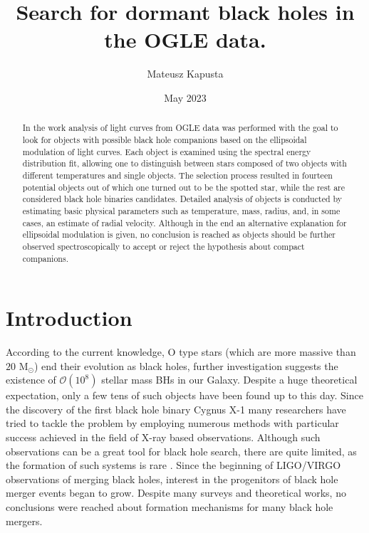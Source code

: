 \documentclass{pracalicmgr}
\author{Mateusz Kapusta}
\title{Search for dormant black holes in the OGLE data.}
\date{May 2023}
\begin{document}
    \maketitle
    \let\cleardoublepage\clearpage
\begin{abstract}
    In the work analysis of light curves from OGLE data was performed with the goal to look for objects with possible black hole companions 
    based on the ellipsoidal modulation of light curves. Each object is examined using the spectral energy distribution fit, allowing one to distinguish
    between stars composed of two objects with different temperatures and single objects. The selection process resulted in fourteen
    potential objects out of which one turned out to be the spotted star, while the rest are considered black hole binaries candidates.
    Detailed analysis of objects is conducted by estimating basic physical parameters such as temperature, mass, radius,
    and, in some cases, an estimate of radial velocity. Although in the end an alternative explanation for ellipsoidal modulation is given, 
    no conclusion is reached as objects should be further observed spectroscopically to accept or reject the hypothesis about compact companions.
\end{abstract}

\tableofcontents

\chapter{Introduction}
According to the current knowledge, O type stars (which are more massive than $20$ M$_\odot$) end their evolution as black holes, further investigation suggests
the existence of $\mathcal{O}(10^8)$ stellar mass BHs \citep{brown_scenario_1994} in our Galaxy.
Despite a huge theoretical expectation, only a few tens of such objects have been found up to this day.
Since the discovery of the first black hole binary Cygnus X-1 many researchers have tried to tackle the problem by employing numerous methods with particular
success achieved in the field of X-ray based observations. Although such observations can be a great tool for black hole search, there are quite limited,
as the formation of such systems is rare \citep{zwart_formation_1997}. Since the beginning of LIGO/VIRGO observations of merging black holes,
interest in the progenitors of black hole merger events began to grow. Despite many surveys and theoretical works, 
no conclusions were reached about formation mechanisms for many black hole mergers. 
\end{document}
